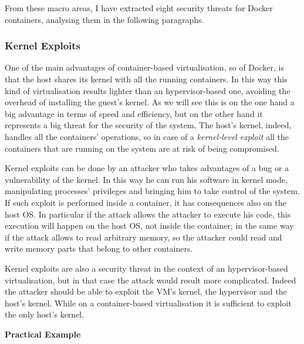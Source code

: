 \documentclass[a4paper,12pt]{article}
\begin{document}
From these macro areas, I have extracted eight security threats for Docker
containers, analysing them in the following paragraphs.
 
\subsubsection{Kernel Exploits}

One of the main advantages of container-based virtualisation, so of Docker,
is that the host shares its kernel with all the running containers. In this way
this kind of virtualisation results lighter than an hypervisor-based one,
avoiding the overhead of installing the guest's kernel. As we will see this is
on the one hand a big advantage in terms of speed and efficiency, but on the
other hand it represents a big threat for the security of the system. The host's
kernel, indeed, handles all the containers' operations, so in case of a
\textit{kernel-level exploit} all the containers that are running on the system
are at risk of being compromised.\par Kernel exploits can be done by an attacker
who takes advantages of a bug or a vulnerability of the kernel. In this way he
can run his software in kernel mode, manipulating processes' privileges and
bringing him to take control of the system. If such exploit is performed inside
a container, it has consequences also on the host OS. In particular if the
attack allows the attacker to execute his code, this execution will happen on
the host OS, not inside the container; in the same way if the attack allows to
read arbitrary memory, so the attacker could read and write memory parts that
belong to other containers.\par Kernel exploits are also a security threat in
the context of an hypervisor-based virtualisation, but in that case the attack
would result more complicated. Indeed the attacker should be able to exploit the
VM's kernel, the hypervisor and the host's kernel. While on a container-based
virtualisation it is sufficient to exploit the only host's kernel.

\bigbreak\textbf{Practical Example}\bigbreak 
\end{document}
